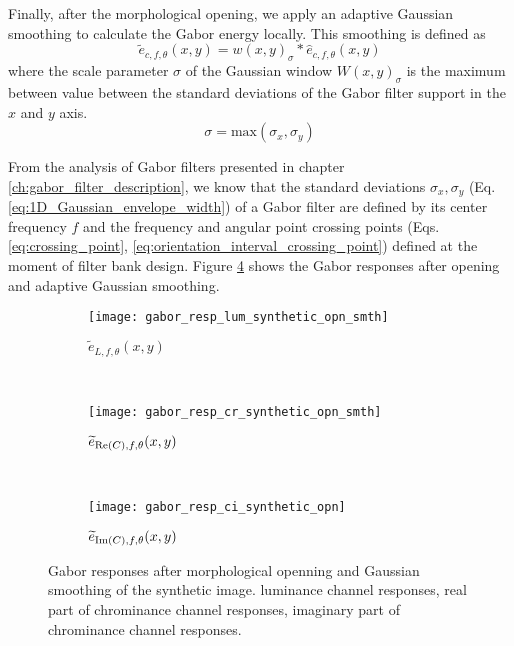 Finally, after the morphological opening, we apply an adaptive Gaussian smoothing to calculate the Gabor energy locally. This smoothing is defined as 
\begin{equation}\label{eq:gabor_energy_smth}
	\widetilde{e}_{c, f, \theta}(x,y) = w(x, y)_\sigma\ast \widehat{e}_{c, f, \theta}(x,y)
\end{equation}
where the scale parameter $\sigma$ of the Gaussian window $W(x,y)_\sigma$ is the maximum between value between the standard deviations of the Gabor filter support in the $x$ and $y$ axis.
\begin{equation}\label{eq:gauss_sigma_smth}
	\sigma = \mathrm{max}(\sigma_x, \sigma_y)
\end{equation}

From the analysis of Gabor filters presented in chapter \ref{ch:gabor_filter_description}, we know that the standard deviations $\sigma_x, \sigma_y$ (Eq. \eqref{eq:1D_Gaussian_envelope_width}) of a Gabor filter are defined by its center frequency $f$ and the frequency and angular point crossing points (Eqs. \eqref{eq:crossing_point}, \eqref{eq:orientation_interval_crossing_point}) defined at the moment of filter bank design. Figure \ref{fig:synthetic_img_gresponses_opn_smth} shows the Gabor responses after opening and adaptive Gaussian smoothing. 

\begin{figure}[!ht]
    \centering
    \begin{subfigure}[b]{\textwidth}   
        \texttt{[image: gabor\_resp\_lum\_synthetic\_opn\_smth]}
        \caption{$\widetilde{e}_{L, f, \theta}(x,y)$} 
        \label{fig:lum_gabor_energies_opn_smth}
    \end{subfigure} \\ [2ex]   
    \begin{subfigure}[b]{\textwidth}   
    	\texttt{[image: gabor\_resp\_cr\_synthetic\_opn\_smth]}
    	\caption{$\widetilde{e}_{\mathrm{Re}(C), f, \theta}(x,y)$}
        \label{fig:cr_gabor_energie_opn_smth}
    \end{subfigure} \\ [2ex]    	
    \begin{subfigure}[b]{\textwidth}  
        \texttt{[image: gabor\_resp\_ci\_synthetic\_opn]}
        \caption{$\widetilde{e}_{\mathrm{Im}(C), f, \theta}(x,y)$}
        \label{fig:ci_gabor_energies_opn_smth} 
    \end{subfigure} 
    	    
    \caption{Gabor responses after morphological openning and Gaussian smoothing of the synthetic image.  luminance channel responses,  real part of chrominance channel responses,  imaginary part of chrominance channel responses.}\label{fig:synthetic_img_gresponses_opn_smth}    
\end{figure}




